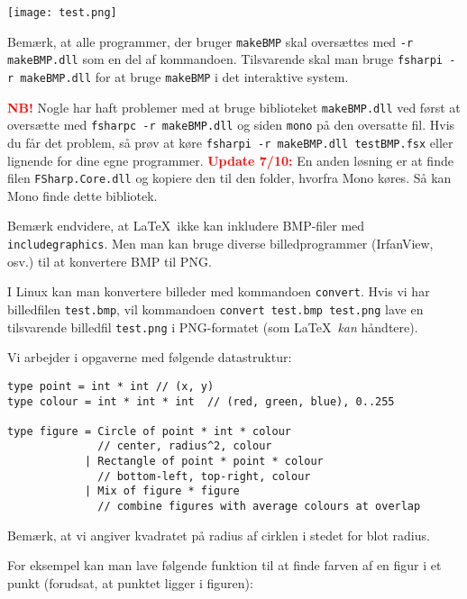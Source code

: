 \documentclass[a4paper]{article}
\begin{document}
\begin{center}
\texttt{[image: test.png]}
\end{center}

\noindent
Bemærk, at alle programmer, der bruger \texttt{makeBMP} skal
oversættes med \texttt{-r makeBMP.dll} som en del af kommandoen.
Tilsvarende skal man bruge \texttt{fsharpi -r makeBMP.dll} for at
bruge \texttt{makeBMP} i det interaktive system.

\textbf{\textcolor{red}{NB!}} Nogle har haft problemer med at bruge
biblioteket \texttt{makeBMP.dll} ved først at oversætte med
\texttt{fsharpc -r makeBMP.dll} og siden \texttt{mono} på den
oversatte fil.  Hvis du får det problem, så prøv at køre
\texttt{fsharpi~-r~makeBMP.dll~testBMP.fsx} eller lignende for dine
egne programmer.  \textbf{\textcolor{red}{Update 7/10:}} En anden
løsning er at finde filen \texttt{FSharp.Core.dll} og kopiere den til
den folder, hvorfra Mono køres.  Så kan Mono finde dette bibliotek.

Bemærk endvidere, at \LaTeX\ ikke kan inkludere BMP-filer med
\texttt{includegraphics}.  Men man kan bruge diverse billedprogrammer
(IrfanView, osv.) til at konvertere BMP til PNG.

I Linux kan man konvertere billeder med kommandoen \texttt{convert}.
Hvis vi har billedfilen \texttt{test.bmp}, vil kommandoen
\texttt{convert~test.bmp~test.png} lave en tilsvarende billedfil
\texttt{test.png} i PNG-formatet (som \LaTeX\ \emph{kan} håndtere).

\vspace{2ex}

\noindent
Vi arbejder i opgaverne med følgende datastruktur:

\begin{verbatim}
type point = int * int // (x, y)
type colour = int * int * int  // (red, green, blue), 0..255

type figure = Circle of point * int * colour
              // center, radius^2, colour
            | Rectangle of point * point * colour
              // bottom-left, top-right, colour
            | Mix of figure * figure
              // combine figures with average colours at overlap
\end{verbatim}

\noindent
Bemærk, at vi angiver kvadratet på radius af cirklen i stedet for blot
 radius.

For eksempel kan man lave følgende funktion til at finde farven af en
 figur i et punkt (forudsat, at punktet ligger i figuren):
\end{document}
